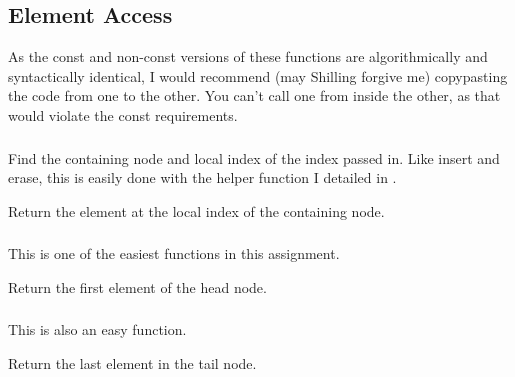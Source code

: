 \subsection{Element Access}

\indent As the const and non-const versions of these functions are algorithmically
and syntactically identical, I would recommend (may Shilling forgive me)
copy\/pasting the code from one to the other. You can't call one from inside
the other, as that would violate the const requirements.

\subsubsection{}
Find the containing node and local index of the index passed in. Like
insert and erase, this is easily done with the  helper
function I detailed in .

Return the element at the local index of the containing node.

\subsubsection{}
This is one of the easiest functions in this assignment.

Return the first element of the head node.

\subsubsection{}
This is also an easy function.

Return the last element in the tail node.
